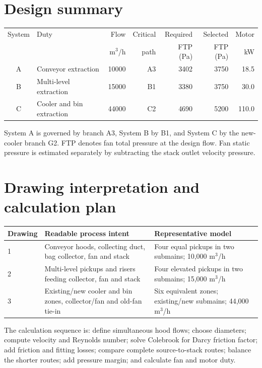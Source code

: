 \documentclass[11pt,a4paper]{article}
\begin{document}
\section{Design summary}
\begin{center}\small
\begin{tabular}{clrrrrr}
\toprule
System & Duty & Flow & Critical & Required & Selected & Motor\\
 & & m$^3$/h & path & FTP (Pa) & FTP (Pa) & kW\\
\midrule
A & Conveyor extraction & 10000 & A3 & 3402 & 3750 & 18.5 \\
B & Multi-level extraction & 15000 & B1 & 3380 & 3750 & 30.0 \\
C & Cooler and bin extraction & 44000 & C2 & 4690 & 5200 & 110.0 \\
\bottomrule
\end{tabular}
\end{center}
System A is governed by branch A3, System B by B1, and System C by the new-cooler branch G2. FTP denotes fan total pressure at the design flow. Fan static pressure is estimated separately by subtracting the stack outlet velocity pressure.

\section{Drawing interpretation and calculation plan}
\begin{tabularx}{\textwidth}{l X X}
\toprule
Drawing & Readable process intent & Representative model\\
\midrule
1 & Conveyor hoods, collecting duct, bag collector, fan and stack & Four equal pickups in two submains; 10,000 m$^3$/h\\
2 & Multi-level pickups and risers feeding collector, fan and stack & Four elevated pickups in two submains; 15,000 m$^3$/h\\
3 & Existing/new cooler and bin zones, collector/fan and old-fan tie-in & Six equivalent zones; existing/new submains; 44,000 m$^3$/h\\
\bottomrule
\end{tabularx}

The calculation sequence is: define simultaneous hood flows; choose diameters; compute velocity and Reynolds number; solve Colebrook for Darcy friction factor; add friction and fitting losses; compare complete source-to-stack routes; balance the shorter routes; add pressure margin; and calculate fan and motor duty.
\end{document}
